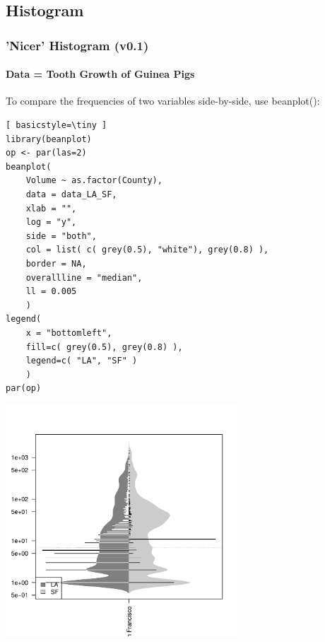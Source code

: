 \subsection{Histogram}
\begin{frame}
\frametitle{'Nicer' Histogram (v0.1)}
  \framesubtitle{Data = Tooth Growth of Guinea Pigs}

To compare the frequencies of two variables side-by-side, use \ttfamily beanplot(): \normalfont

	\begin{lstlisting}[ basicstyle=\tiny ]
library(beanplot)
op <- par(las=2)
beanplot(
	Volume ~ as.factor(County), 
	data = data_LA_SF, 
	xlab = "",
	log = "y",
	side = "both", 
	col = list( c( grey(0.5), "white"), grey(0.8) ), 
	border = NA, 
	overallline = "median", 
	ll = 0.005
	)
legend(
	x = "bottomleft",
	fill=c( grey(0.5), grey(0.8) ), 
	legend=c( "LA", "SF" )
	)
par(op)
	\end{lstlisting}

        \begin{center}
	         \includegraphics[width=0.65\textwidth]{images/beanplot_v0.pdf}
        \end{center}

\end{frame}


%


